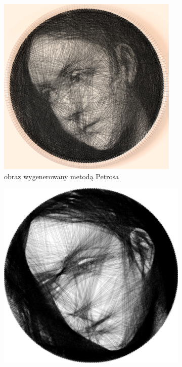 \begin{figure}[H]
\begin{subfigure}{0.32\textwidth}
        \includegraphics[width = \textwidth]{img/6-comp/magdalene_petros_.jpg}
        \caption{obraz wygenerowany metodą Petrosa}
        \label{comp-comp-magdalene-b}
    \end{subfigure}
    \begin{subfigure}{0.32\textwidth}
        \centering
        \includegraphics[width = \textwidth]{img/6-comp/magdalene_birsak_.png}

\end{subfigure}
\end{figure}
